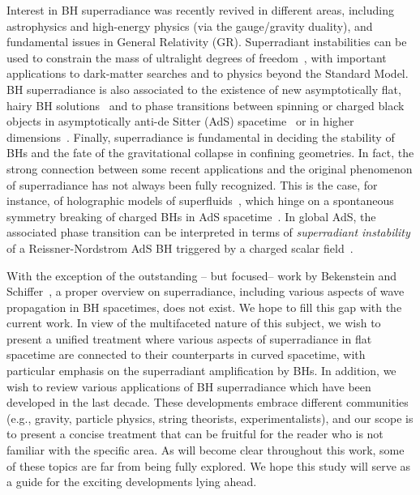\documentclass[11pt]{article}
\numberwithin{equation}{section} %
\begin{document}
Interest in BH superradiance was recently revived in different areas, including astrophysics and high-energy physics (via the gauge/gravity duality), and fundamental issues in General Relativity (GR). 
%
Superradiant instabilities can be used to constrain the mass of ultralight degrees of freedom~\cite{Arvanitaki:2009fg,Arvanitaki:2010sy,Pani:2012vp,Brito:2013wya}, with important applications to dark-matter searches and to physics beyond the Standard Model. BH superradiance is also associated to the existence of new asymptotically flat, hairy BH solutions~\cite{Herdeiro:2014goa} and to phase transitions between spinning or charged black objects in asymptotically anti-de Sitter (AdS) spacetime~\cite{Cardoso:2004hs,Dias:2011tj,Dias:2011at} or in higher dimensions~\cite{Shibata:2010wz}. Finally, superradiance is fundamental in deciding the stability of BHs and the fate of the gravitational collapse in confining geometries.
%
In fact, the strong connection between some recent applications and the original phenomenon of superradiance has not always been fully recognized. This is the case, for instance, of holographic models of superfluids~\cite{Hartnoll:2008vx}, which hinge on a spontaneous symmetry breaking of charged BHs in AdS spacetime~\cite{Gubser:2008px}. 
In global AdS, the associated phase transition can be interpreted in terms of \emph{superradiant instability} of a 
Reissner-Nordstrom AdS BH triggered by a charged scalar field~\cite{Hartnoll:2011fn,Dias:2011tj}. 
 
With the exception of the outstanding -- but focused-- work by Bekenstein and Schiffer~\cite{Bekenstein:1998nt}, a 
proper overview on superradiance, including various aspects of wave propagation in BH spacetimes, does not exist. We 
hope to fill this gap with the current work. 
%
In view of the multifaceted nature of this subject, we wish to present a unified treatment where various aspects of superradiance in flat spacetime are connected to their counterparts in curved spacetime, with particular emphasis on the superradiant amplification by BHs. 
In addition, we wish to review various applications of BH superradiance which have been developed in the last decade. 
These developments embrace different communities (e.g., gravity, particle physics, string 
theorists, experimentalists), and our scope is to present a concise treatment that can be fruitful for the reader who 
is not familiar with the specific area. As will become clear throughout this work, some of these topics are far from 
being fully explored. We hope this study will serve as a guide for the exciting developments lying ahead. 
\end{document}
